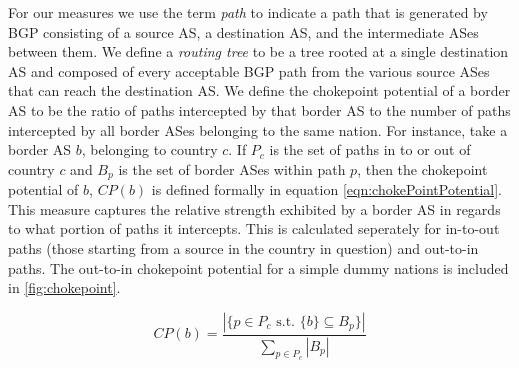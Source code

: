 
\par
For our measures we use the term \textit{path} to indicate a path that is generated by BGP consisting of a source AS, a destination AS, and the intermediate
ASes between them. We define a \textit{routing tree} to be a tree rooted at a single destination AS and composed of every acceptable BGP path from the various source ASes that can reach the destination AS.
We define the chokepoint potential of a border AS to be the ratio of paths intercepted by that border AS
to the number of paths intercepted by all border ASes belonging to the same nation. For instance, take a border AS $b$, belonging to country $c$.
If $P_c$ is the set of paths in to or out of country $c$ and $B_p$ is the set of border ASes within path $p$, then the
chokepoint potential of $b$, $CP(b)$ is defined formally in equation \ref{eqn:chokePointPotential}. This measure captures
the relative strength exhibited by a border AS in regards to what portion of paths it intercepts. This is calculated
seperately for in-to-out paths (those starting from a source in the country in question) and out-to-in paths. The out-to-in chokepoint potential for a simple dummy nations
is included in \figurename \ref{fig:chokepoint}.

\begin{equation}\label{eqn:chokePointPotential}
CP(b) = \frac{|\{p \in P_c \textrm{ s.t. } \{b\} \subseteq B_p\}|}{\sum_{p \in P_c}|B_p|}
\end{equation}

